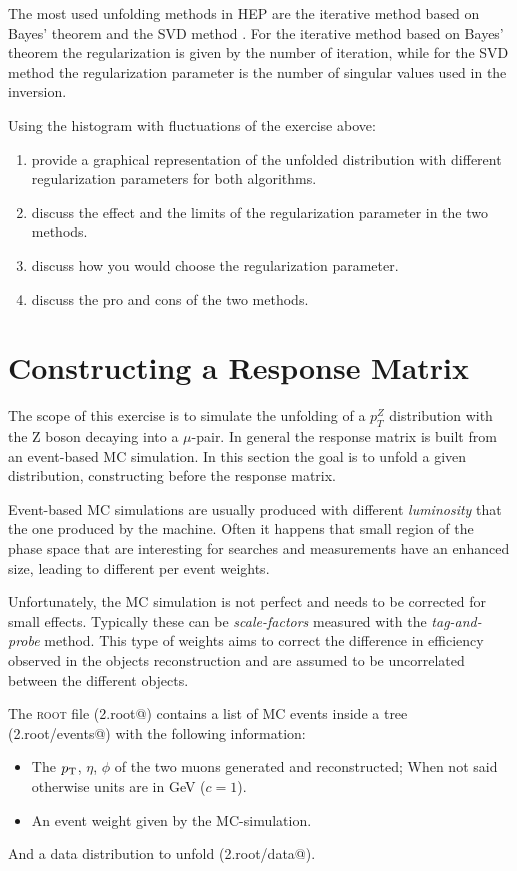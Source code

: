 \documentclass[a4paper,11pt]{article}
\begin{document}
The most used unfolding methods in \gls{HEP} are the iterative method based on Bayes' theorem \cite{dAgostini} and the \gls{SVD} method \cite{SVD}.
For the iterative method based on Bayes' theorem the regularization is given by the number of iteration, while for the \gls{SVD} method the regularization parameter is the number of singular values used in the inversion.

Using the histogram with fluctuations of the exercise above:
\begin{enumerate}
	\item provide a graphical representation of the unfolded distribution with different regularization parameters for both algorithms.
	\item discuss the effect and the limits of the regularization parameter in the two methods.
	\item discuss how you would choose the regularization parameter.
	\item discuss the pro and cons of the two methods.
\end{enumerate}

\section{Constructing a Response Matrix}

The scope of this exercise is to simulate the unfolding of a $p_{T}^{Z}$ distribution with the $\mathrm{Z}$ 
boson decaying into a $\mu$-pair.
In general the response matrix is built from an event-based \gls{MC} simulation.
In this section the goal is to unfold a given distribution, constructing before the response matrix.

Event-based \gls{MC} simulations
are usually produced with different \emph{luminosity} that the one produced by the machine.
Often it happens that small region of the phase space that are interesting for searches and measurements have an enhanced size, 
leading to different per event weights.

Unfortunately, the \gls{MC} simulation is not perfect and needs to be corrected for small effects.
Typically these can be \emph{scale-factors} measured with the \emph{tag-and-probe} method. 
This type of weights aims to correct the difference in efficiency observed in the objects reconstruction
and are assumed to be uncorrelated between the different objects.

The {\scshape root} file (\verb@Exe2.root@) contains a list of \gls{MC} events inside a tree (\verb@Exe2.root/events@) with the following information:
\begin{itemize}
	\item The $p_\textup{T}$, $\eta$, $\phi$ of the two muons generated and reconstructed; 
	      When not said otherwise units are in GeV ($c=1$).
	\item An event weight given by the \gls{MC}-simulation. 
\end{itemize}
And a data distribution to unfold (\verb@Exe2.root/data@). 
\end{document}

